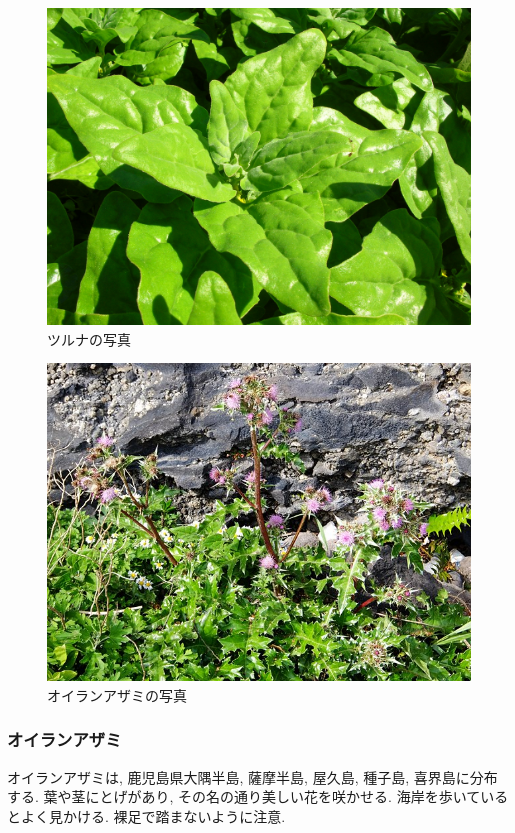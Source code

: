 \documentclass[10pt,titlepage,a5paper]{ltjsbook}
\begin{document}
    \begin{minipage}{0.38\columnwidth}
      \begin{figure}[H]
            \centering
            \includegraphics[width=\columnwidth]{tsuruna.jpg}
            \caption{ツルナの写真}
            \label{fig:tsuruna_photo}
        \end{figure}
    \end{minipage}
    \begin{minipage}{0.38\columnwidth}
      \begin{figure}[H]
            \centering
            \includegraphics[width=\columnwidth]{oiranazami.jpg}
            \caption{オイランアザミの写真}
            \label{fig:oiranazami_photo}
        \end{figure}
    \end{minipage}
    \hfill
    \begin{minipage}{0.58\columnwidth}
      \subsubsection*{オイランアザミ}
      オイランアザミは, 鹿児島県大隅半島, 薩摩半島, 屋久島, 種子島, 喜界島に分布する. 葉や茎にとげがあり, その名の通り美しい花を咲かせる. 海岸を歩いているとよく見かける. 裸足で踏まないように注意.
    \end{minipage}
\end{document}
